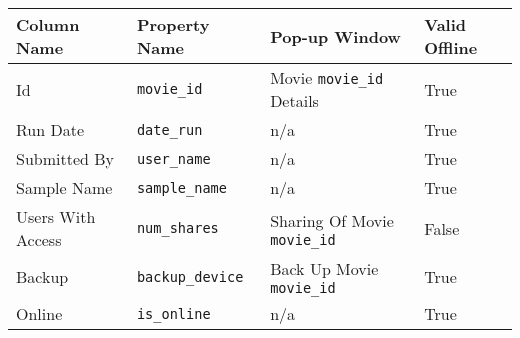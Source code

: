 \begin{tabularx}{\textwidth}{X|l|X|l}
\toprule
 Column Name       & Property Name   & Pop-up Window             & Valid Offline   \\
\midrule
 Id                & \texttt{movie\_id}        & Movie \texttt{movie\_id} Details    & True            \\
 Run Date          & \texttt{date\_run}        & n/a                       & True            \\
 Submitted By      & \texttt{user\_name}       & n/a                       & True            \\
 Sample Name       & \texttt{sample\_name}     & n/a                       & True            \\
 Users With Access & \texttt{num\_shares}      & Sharing Of Movie \texttt{movie\_id} & False           \\
 Backup            & \texttt{backup\_device}   & Back Up Movie \texttt{movie\_id}    & True            \\
 Online            & \texttt{is\_online}       & n/a                       & True            \\
\bottomrule
\end{tabularx}